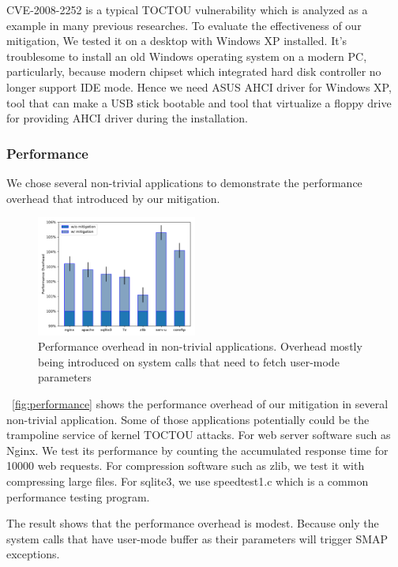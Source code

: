 CVE-2008-2252 is a typical TOCTOU vulnerability which is analyzed as a example in many previous researches. To evaluate the effectiveness of our mitigation, We tested it on a desktop with Windows XP installed. It's troublesome to install an old Windows operating system on a modern PC, particularly, because modern chipset which integrated hard disk controller no longer support IDE mode. Hence we need ASUS AHCI driver for Windows XP, tool that can make a USB stick bootable and tool that virtualize a floppy drive~\cite{installxpskylake} for providing AHCI driver during the installation.

\subsubsection{Performance}

We chose several non-trivial applications to demonstrate the performance overhead that introduced by our mitigation. 

\begin{figure}[th]
  \includegraphics[width=0.47\textwidth]{figures/performance}
  \centering
  \caption{Performance overhead in non-trivial applications. Overhead mostly being introduced on system calls that need to fetch user-mode parameters}
  \label{fig:performance}
\end{figure}

~\autoref{fig:performance} shows the performance overhead of our mitigation in several non-trivial application. Some of those applications potentially could be the trampoline service of kernel TOCTOU attacks.
For web server software such as Nginx. We test its performance by counting the accumulated response time for 10000 web requests. For compression software such as zlib, we test it with compressing large files. For sqlite3, we use speedtest1.c which is a common performance testing program.

The result shows that the performance overhead is modest. Because only the system calls that have user-mode buffer as their parameters will trigger SMAP exceptions. 

